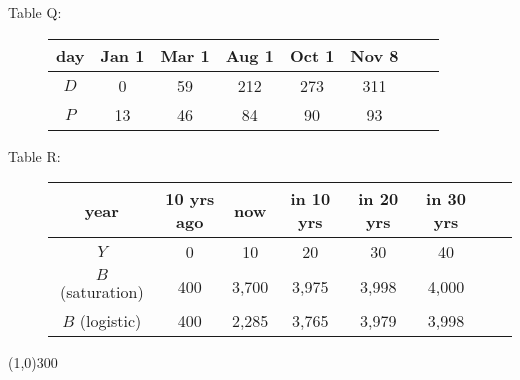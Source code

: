 \begin{description}
\item[\quad Table Q: \quad] 
\begin{tabular} {|c| |c|c |c|c |c|c |c|}\hline
day & Jan 1 & Mar 1 & Aug 1 & Oct 1 & Nov 8\\ \hline
$D$ & 0 & 59 & 212 & 273 & 311\\ \hline
$P$ &  13 & 46 & 84 & 90 & 93 \\ \hline
\end{tabular}
\end{description}

\begin{description}
\item[\quad Table R: \quad] 
\begin{tabular} {|c| |c|c |c|c |c|c |c|}\hline
year & 10 yrs ago & now & in 10 yrs & in 20 yrs & in  30 yrs \\ \hline
$Y$ & 0 & 10 & 20 & 30 & 40 \\ \hline
$B$ (saturation) & 400 & 3,700 & 3,975 & 3,998 & 4,000 \\ \hline
$B$ (logistic) & 400 & 2,285 & 3,765 & 3,979 & 3,998 \\ \hline
\end{tabular}
\end{description}

\bigskip

\begin{center}
\line(1,0){300} %
\end{center}

